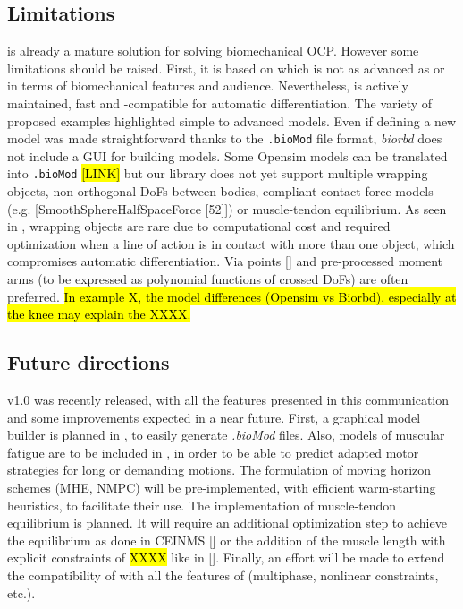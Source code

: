 \subsection{Limitations}

\bioptim is already a mature solution for solving biomechanical OCP. 
However some limitations should be raised. 
First, it is based on  \biorbd which is not as advanced as \opensim or \anybody in terms of biomechanical features and audience.
Nevertheless,  \biorbd is actively maintained, fast and \casadi-compatible for automatic differentiation.
The variety of proposed examples highlighted simple to advanced models.
Even if defining a new model was made straightforward thanks to the \texttt{.bioMod} file format, \textit{biorbd} does not include a GUI for building models. 
Some Opensim models can be translated into \texttt{.bioMod} \hl{[LINK]} but our library does not yet support multiple wrapping objects, non-orthogonal DoFs between bodies, compliant contact force models (e.g. [SmoothSphereHalfSpaceForce [52]]) or muscle-tendon equilibrium. 
As seen in \moco, wrapping objects are rare due to computational cost and required optimization when a line of action is in contact with more than one object, which compromises automatic differentiation. 
Via points [\addref] and pre-processed moment arms (to be expressed as polynomial functions of crossed DoFs) are often preferred. 
\hl{In example X, the model differences (Opensim vs Biorbd), especially at the knee may explain the XXXX.} 


\subsection{Future directions}

\bioptim v1.0 was recently released, with all the features presented in this communication and some improvements expected in a near future.
First, a graphical model builder is planned in \biorbd, to easily generate \textit{.bioMod} files.
Also, models of muscular fatigue are to be included in \bioptim, in order to be able to predict adapted motor strategies for long or demanding motions.
The formulation of moving horizon schemes (MHE, NMPC) will be pre-implemented, with efficient warm-starting heuristics, to facilitate their use.
The implementation of muscle-tendon equilibrium is planned. It will require an additional optimization step to achieve the equilibrium as done in CEINMS [\addref] or the addition of the  muscle length with explicit constraints of \hl{XXXX} like in [\addref].  
Finally, an effort will be made to extend the compatibility of \acados with all the features of \bioptim (multiphase, nonlinear constraints, etc.). 
